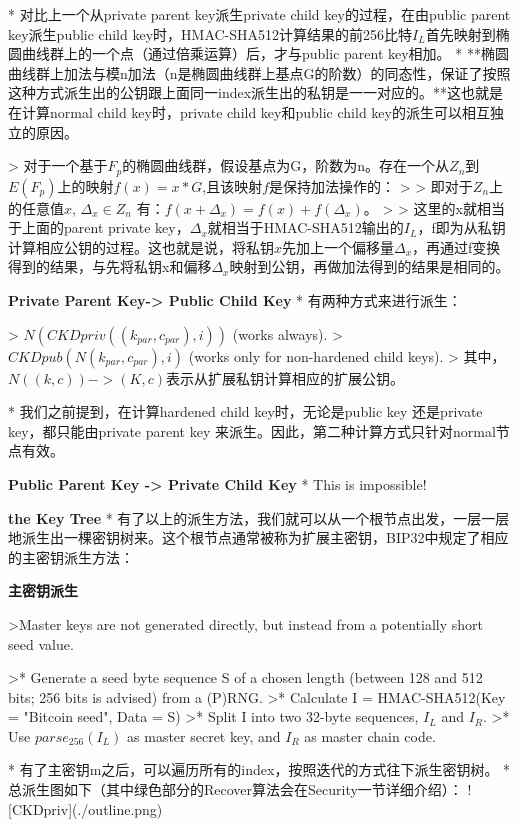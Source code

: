 \documentclass{article}
\begin{document}
* 对比上一个从private parent key派生private child key的过程，在由public parent key派生public child key时，HMAC-SHA512计算结果的前256比特$I_L$首先映射到椭圆曲线群上的一个点（通过倍乘运算）后，才与public parent key相加。
* **椭圆曲线群上加法与模n加法（n是椭圆曲线群上基点G的阶数）的同态性，保证了按照这种方式派生出的公钥跟上面同一index派生出的私钥是一一对应的。**这也就是在计算normal child key时，private child key和public child key的派生可以相互独立的原因。

> 对于一个基于$F_p$的椭圆曲线群，假设基点为G，阶数为n。存在一个从$Z_n$到$E(F_p)$上的映射$f(x)=x*G$,且该映射$f$是保持加法操作的：
> > 即对于$Z_n$上的任意值$x$, $\Delta_x \in Z_n$ 有：$f(x+\Delta_x)=f(x)+f(\Delta_x)$。   
> 
> 这里的x就相当于上面的parent private key，$\Delta_x$就相当于HMAC-SHA512输出的$I_L$，f即为从私钥计算相应公钥的过程。这也就是说，将私钥$x$先加上一个偏移量$\Delta_x$，再通过f变换得到的结果，与先将私钥x和偏移$\Delta_x$映射到公钥，再做加法得到的结果是相同的。

\textbf{Private Parent Key-> Public Child Key}
* 有两种方式来进行派生：

> $N(CKDpriv((k_{par}, c_{par}), i))$ (works always).  
> $CKDpub(N(k_{par}, c_{par}), i)$ (works only for non-hardened child keys).  
> 其中，$N((k, c)) -> (K, c)$表示从扩展私钥计算相应的扩展公钥。

* 我们之前提到，在计算hardened child key时，无论是public key 还是private key，都只能由private parent key 来派生。因此，第二种计算方式只针对normal节点有效。

\textbf{Public Parent Key -> Private Child Key}
* This is impossible!

\textbf{the Key Tree}
* 有了以上的派生方法，我们就可以从一个根节点出发，一层一层地派生出一棵密钥树来。这个根节点通常被称为扩展主密钥，BIP32中规定了相应的主密钥派生方法：

\textbf{主密钥派生}

>Master keys are not generated directly, but instead from a potentially short seed value.

>* Generate a seed byte sequence S of a chosen length (between 128 and 512 bits; 256 bits is advised) from a (P)RNG.
>* Calculate I = HMAC-SHA512(Key = "Bitcoin seed", Data = S)
>* Split I into two 32-byte sequences, $I_L$ and $I_R$.
>* Use $parse_{256}(I_L)$ as master secret key, and $I_R$ as master chain code.
 
* 有了主密钥m之后，可以遍历所有的index，按照迭代的方式往下派生密钥树。
* 总派生图如下（其中绿色部分的Recover算法会在Security一节详细介绍）：
![CKDpriv](./outline.png)
\end{document}
